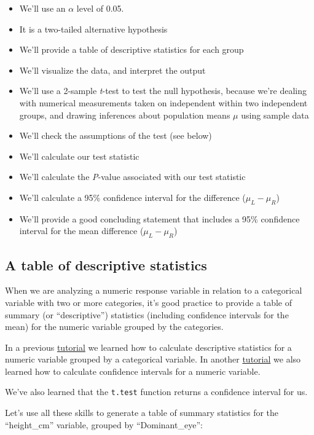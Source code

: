 \documentclass[
]{book}
\providecommand{\tightlist}{%
  \setlength{\itemsep}{0pt}\setlength{\parskip}{0pt}}
\begin{document}
\begin{itemize}
\tightlist
\item
  We'll use an \(\alpha\) level of 0.05.\\
\item
  It is a two-tailed alternative hypothesis
\item
  We'll provide a table of descriptive statistics for each group
\item
  We'll visualize the data, and interpret the output
\item
  We'll use a 2-sample \emph{t}-test to test the null hypothesis, because we're dealing with numerical measurements taken on independent within two independent groups, and drawing inferences about population means \(\mu\) using sample data\\
\item
  We'll check the assumptions of the test (see below)
\item
  We'll calculate our test statistic
\item
  We'll calculate the \emph{P}-value associated with our test statistic
\item
  We'll calculate a 95\% confidence interval for the difference (\(\mu_L - \mu_R\))
\item
  We'll provide a good concluding statement that includes a 95\% confidence interval for the mean difference (\(\mu_L - \mu_R\))
\end{itemize}

\subsection{A table of descriptive statistics}\label{stats_2samp}

When we are analyzing a numeric response variable in relation to a categorical variable with two or more categories, it's good practice to provide a table of summary (or ``descriptive'') statistics (including confidence intervals for the mean) for the numeric variable grouped by the categories.

In a previous \hyperref[desc_numeric_var_cat]{tutorial} we learned how to calculate descriptive statistics for a numeric variable grouped by a categorical variable. In another \hyperref[conf_precision]{tutorial} we also learned how to calculate confidence intervals for a numeric variable.

We've also learned that the \texttt{t.test} function returns a confidence interval for us.

Let's use all these skills to generate a table of summary statistics for the ``height\_cm'' variable, grouped by ``Dominant\_eye'':
\end{document}
